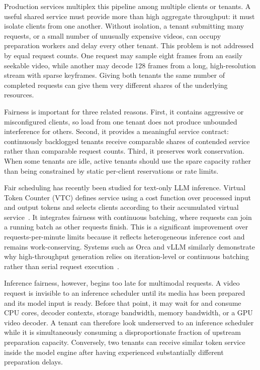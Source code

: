 \documentclass[sigplan,anonymous,review,nonacm]{acmart}
\begin{document}
Production services multiplex this pipeline among multiple clients or
tenants. A useful shared service must provide more than high aggregate
throughput: it must isolate clients from one another. Without isolation, a
tenant submitting many requests, or a small number of unusually expensive
videos, can occupy preparation workers and delay every other tenant. This
problem is not addressed by equal request counts. One request may sample eight
frames from an easily seekable video, while another may decode 128 frames from
a long, high-resolution stream with sparse keyframes. Giving both tenants the
same number of completed requests can give them very different shares of the
underlying resources.

Fairness is important for three related reasons. First, it contains aggressive
or misconfigured clients, so load from one tenant does not produce unbounded
interference for others. Second, it provides a meaningful service contract:
continuously backlogged tenants receive comparable shares of contended service
rather than comparable request counts. Third, it preserves work conservation.
When some tenants are idle, active tenants should use the spare capacity rather
than being constrained by static per-client reservations or rate limits.

Fair scheduling has recently been studied for text-only LLM inference. Virtual
Token Counter (VTC) defines service using a cost function over processed input
and output tokens and selects clients according to their accumulated virtual
service~\cite{sheng2024vtc}. It integrates fairness with continuous batching,
where requests can join a running batch as other requests finish. This is a
significant improvement over requests-per-minute limits because it reflects
heterogeneous inference cost and remains work-conserving. Systems such as Orca
and vLLM similarly demonstrate why high-throughput generation relies on
iteration-level or continuous batching rather than serial request
execution~\cite{yu2022orca,kwon2023vllm}.

Inference fairness, however, begins too late for multimodal requests. A video
request is invisible to an inference scheduler until its media has been
prepared and its model input is ready. Before that point, it may wait for and
consume CPU cores, decoder contexts, storage bandwidth, memory bandwidth, or a
GPU video decoder. A tenant can therefore look underserved to an inference
scheduler while it is simultaneously consuming a disproportionate fraction of
upstream preparation capacity. Conversely, two tenants can receive similar
token service inside the model engine after having experienced substantially
different preparation delays.
\end{document}

